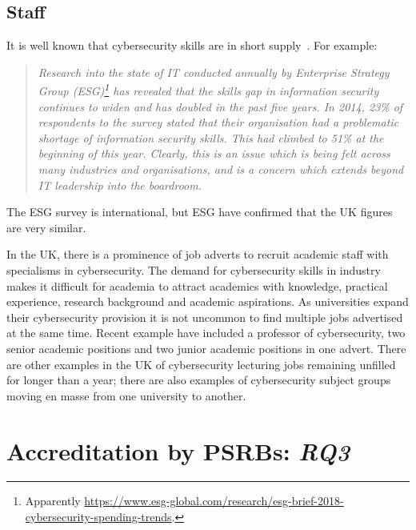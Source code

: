 \documentclass[conference]{IEEEtran}
\begin{document}
\subsection{Staff}

It is well known that cybersecurity skills are in short supply~\cite{schneider2013}. For example:
\begin{quote}
{\emph{Research into the state of IT conducted annually by Enterprise Strategy Group (ESG)\footnote{Apparently \url{https://www.esg-global.com/research/esg-brief-2018-cybersecurity-spending-trends}.} has revealed that the skills gap in information security continues to widen and has doubled in the past five years. In 2014, 23\% of respondents to the survey stated that their organisation had a problematic shortage of information security skills. This had climbed to 51\% at the beginning of this year. Clearly, this is an issue which is being felt across many industries and organisations, and is a concern which extends beyond IT leadership into the boardroom.}}~\cite{Page2018a}
\end{quote}
The ESG survey is international, but ESG have confirmed that the UK figures are very similar.

In the UK, there is a prominence of job adverts to recruit academic staff with specialisms in cybersecurity. The demand for cybersecurity skills in industry makes it difficult for academia to attract academics with knowledge, practical experience, research background and academic aspirations. As universities expand their cybersecurity provision it is not uncommon to find multiple jobs advertised at the same time. Recent example have included a professor of cybersecurity, two senior academic positions and two junior academic positions in one advert. There are other examples in the UK of cybersecurity lecturing jobs remaining unfilled for longer than a year; there are also examples of cybersecurity subject groups moving en masse from one university to another.


\section{Accreditation by PSRBs: {\emph{RQ3}}}
\end{document}

